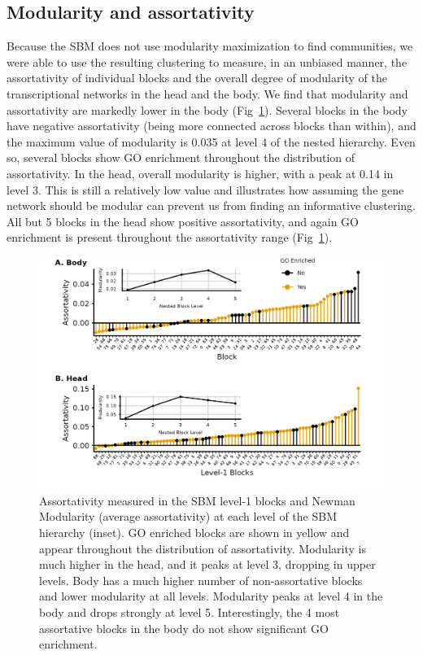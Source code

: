 \documentclass[
]{article}
\begin{document}
\subsection{Modularity and
assortativity}\label{modularity-and-assortativity-1}

Because the SBM does not use modularity maximization to find
communities, we were able to use the resulting clustering to measure, in
an unbiased manner, the assortativity of individual blocks and the
overall degree of modularity of the transcriptional networks in the head
and the body. We find that modularity and assortativity are markedly
lower in the body (Fig~\ref{fig:modularity}). Several blocks in the body
have negative assortativity (being more connected across blocks than
within), and the maximum value of modularity is 0.035 at level 4 of the
nested hierarchy. Even so, several blocks show GO enrichment throughout
the distribution of assortativity. In the head, overall modularity is
higher, with a peak at 0.14 in level 3. This is still a relatively low
value and illustrates how assuming the gene network should be modular
can prevent us from finding an informative clustering. All but 5 blocks
in the head show positive assortativity, and again GO enrichment is
present throughout the assortativity range (Fig~\ref{fig:modularity}).

\begin{figure}
\centering
\includegraphics{figures/assortativity.png}
\caption{Assortativity measured in the SBM level-1 blocks and Newman
Modularity (average assortativity) at each level of the SBM hierarchy
(inset). GO enriched blocks are shown in yellow and appear throughout
the distribution of assortativity. Modularity is much higher in the
head, and it peaks at level 3, dropping in upper levels. Body has a much
higher number of non-assortative blocks and lower modularity at all
levels. Modularity peaks at level 4 in the body and drops strongly at
level 5. Interestingly, the 4 most assortative blocks in the body do not
show significant GO enrichment.}\label{fig:modularity}
\end{figure}
\end{document}
